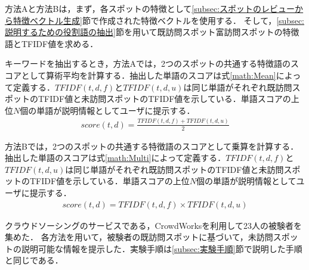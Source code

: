 \documentclass{deimj}
\begin{document}
方法Aと方法Bは，まず，各スポットの特徴として\ref{subsec:スポットのレビューから特徴ベクトル生成}節で作成された特徴ベクトルを使用する．
そして，\ref{subsec:説明するための役割語の抽出}節を用いて既訪問スポット富訪問スポットの特徴語とTFIDF値を求める．

キーワードを抽出するとき，方法Aでは，2つのスポットの共通する特徴語のスコアとして算術平均を計算する．抽出した単語のスコアは式\ref{math:Mean}によって定義する．$TFIDF(t,d,f)$と$TFIDF(t,d,u)$は同じ単語がそれぞれ既訪問スポットのTFIDF値と未訪問スポットのTFIDF値を示している．単語スコアの上位$N$個の単語が説明情報としてユーザに提示する．
\begin{eqnarray}
  score(t,d) = \frac{TFIDF(t,d,f) + TFIDF(t,d,u)}{2}
  \label{math:Mean}
\end{eqnarray}

方法Bでは，2つのスポットの共通する特徴語のスコアとして乗算を計算する．抽出した単語のスコアは式\ref{math:Multi}によって定義する．$TFIDF(t,d,f)$と$TFIDF(t,d,u)$は同じ単語がそれぞれ既訪問スポットのTFIDF値と未訪問スポットのTFIDF値を示している．単語スコアの上位$N$個の単語が説明情報としてユーザに提示する．
\begin{eqnarray}
  score(t,d) = TFIDF(t,d,f) \times TFIDF(t,d,u)
  \label{math:Multi}
\end{eqnarray}

クラウドソーシングのサービスである，CrowdWorksを利用して23人の被験者を集めた．
各方法を用いて，被験者の既訪問スポットに基づいて，未訪問スポットの説明可能な情報を提示した．実験手順は\ref{subsec:実験手順}節で説明した手順と同じである．

\end{document}
